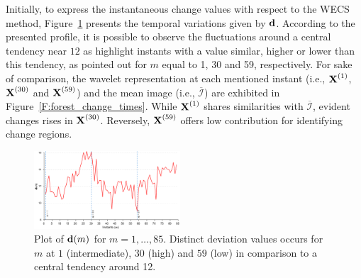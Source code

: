 \documentclass[journal]{IEEEtran}
\newcommand{\vd}{{\textbf d}}
\newcommand{\vX}{{\textbf X}}
\begin{document}
Initially, to express the instantaneous change values with respect to the WECS method,
Figure~\ref{F:forest_wecs} presents the temporal variations given by $\vd$. According to the presented profile, it is possible to observe the fluctuations around a central tendency near $12$ as highlight instants with a value similar, higher or lower than this tendency, as pointed out for $m$ equal to 1, 30 and 59, respectively.
%
For sake of comparison, the wavelet representation at each mentioned instant (i.e., $\vX^{(1)}$, $\vX^{(30)}$ and $\vX^{(59)}$) and the mean image (i.e., $\overline{\mathcal{I}}$) are exhibited in Figure~\ref{F:forest_change_times}. While $\vX^{(1)}$ shares similarities with $\overline{\mathcal{I}}$, evident changes rises in $\vX^{(30)}$. Reversely, $\vX^{(59)}$ offers low contribution for identifying change regions.



\begin{figure}[htb!]
\centering
\includegraphics[width=0.485\textwidth]{../../graphs/LineInstants_1-30-59.pdf}
\caption{Plot of $\vd(m)$ for $m=1,\ldots,85$. Distinct deviation values occurs for $m$ at $1$ (intermediate), $30$ (high) and $59$ (low) in comparison to a central tendency around 12.}\label{F:forest_wecs}
\end{figure}
\end{document}
